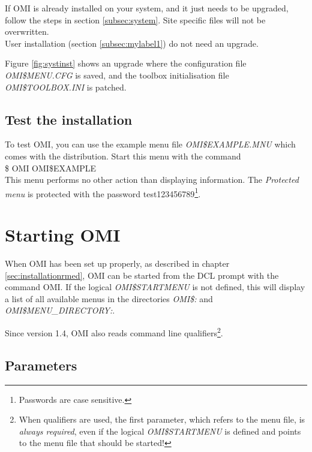 \documentclass[a4paper]{book}
\renewcommand{\indent}{\hspace*{5mm}}
\begin{document}
If OMI is already installed on your system, and it just needs to be upgraded,
follow the steps in section \ref{subsec:system}. Site specific files will not be
overwritten. \\
User installation (section \ref{subsec:mylabel1}) do not need an upgrade.

Figure \ref{fig:systinst} shows an upgrade where the configuration file \textsl{OMI{\$}MENU.CFG}
is saved, and the toolbox initialisation file \textsl{OMI{\$}TOOLBOX.INI} is patched.

\section{Test the installation}
\label{subsec:mylabel2}

To test OMI, you can use the example menu file \textsl{OMI{\$}EXAMPLE.MNU} which 
comes with the distribution. Start this menu with the command \\
\indent\textsf{{\$} OMI OMI{\$}EXAMPLE}\\
This menu performs no other action than displaying information. The 
\textsl{Protected menu} is protected with the password \textsf{test123456789}\footnote{ Passwords are case sensitive.}.

\chapter{Starting OMI}
\label{sec:starting}

When OMI has been set up properly, as described in chapter 
\ref{sec:installationrmed}, OMI can be started from the DCL prompt with the 
command \textsf{OMI}. If the logical \linebreak\textsl{OMI{\$}STARTMENU} is not defined, this 
will display a list of all available menus in the directories \textsl{OMI{\$}:} and 
\textsl{OMI{\$}MENU{\_}DIRECTORY:}.

Since version 1.4, OMI also reads command line qualifiers\footnote{ When qualifiers are used, the first parameter, which refers 
to the menu file, is \textit{always required}, even if the logical \textsl{OMI{\$}STARTMENU} is defined and 
points to the menu file that should be started!}.

\section{Parameters}
\label{subsec:parameters}
\end{document}

